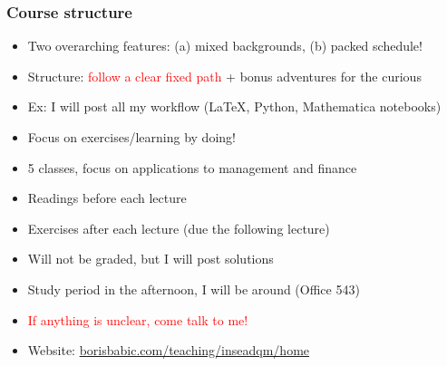 \documentclass[xcolor=dvipsnames, 9pt]{beamer} %
\begin{document}
\begin{frame}
\frametitle{Course structure}
\begin{itemize}
	\itemsep\setlength{1em}
\item Two overarching features: (a) mixed backgrounds, (b) packed schedule!
\item Structure: \textcolor{red}{follow a clear fixed path} + bonus adventures for the curious
\item[] Ex: I will post all my workflow (LaTeX, Python, Mathematica notebooks)
\item Focus on exercises/learning by doing!
\item 5 classes, focus on applications to management and finance
\item Readings before each lecture
\item Exercises after each lecture (due the following lecture)
\item[] Will not be graded, but I will post solutions
\item Study period in the afternoon, I will be around (Office 543)
\item \textcolor{red}{If anything is unclear, come talk to me!}
\item Website: \textcolor{red}{\href{borisbabic.com/teaching/inseadqm/home}{borisbabic.com/teaching/inseadqm/home}}
\end{itemize}
\end{frame}
\end{document}
